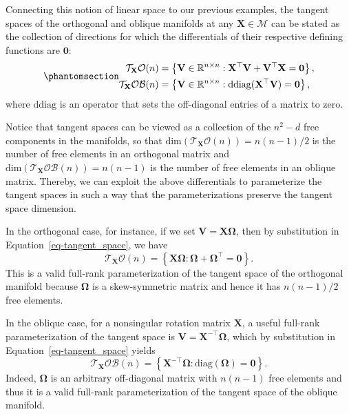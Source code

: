 \documentclass[
  12pt,
  letterpaper,
  article]{scrartcl}
\begin{document}
Connecting this notion of linear space to our previous examples, the
tangent spaces of the orthogonal and oblique manifolds at any
\(\mathbf{X} \in \mathcal{M}\) can be stated as the collection of
directions for which the differentials of their respective defining
functions are \(\mathbf{0}\):
\begin{equation}\protect\phantomsection\label{eq-tangent_space}{
\begin{aligned}
\mathcal{T}_{\mathbf{X}}\mathcal{O}(n) &= \left\{ \mathbf{V}\in\mathbb{R}^{n\times n}: \mathbf{X}^\top\mathbf{V} + \mathbf{V}^\top\mathbf{X} = \mathbf{0} \right\}, \\
\mathcal{T}_{\mathbf{X}}\mathcal{OB}(n) &= \left\{ \mathbf{V}\in\mathbb{R}^{n\times n}: \mathrm{ddiag}(\mathbf{X}^\top\mathbf{V}) = \mathbf{0} \right\},
\end{aligned}
}\end{equation} where \(\mathrm{ddiag}\) is an operator that sets the
off-diagonal entries of a matrix to zero.

Notice that tangent spaces can be viewed as a collection of the
\(n^2-d\) free components in the manifolds, so that
\(\mathrm{dim}(\mathcal{T}_{\mathbf{X}}\mathcal{O}(n)) = n(n-1)/2\) is
the number of free elements in an orthogonal matrix and
\(\mathrm{dim}(\mathcal{T}_{\mathbf{X}}\mathcal{OB}(n)) = n(n-1)\) is
the number of free elements in an oblique matrix. Thereby, we can
exploit the above differentials to parameterize the tangent spaces in
such a way that the parameterizations preserve the tangent space
dimension.

In the orthogonal case, for instance, if we set
\(\mathbf{V} = \mathbf{X\Omega}\), then by substitution in
Equation~\ref{eq-tangent_space}, we have \[
\mathcal{T}_{\mathbf{X}}\mathcal{O}(n) = \left\{ \mathbf{X\Omega}: \mathbf{\Omega} + \mathbf{\Omega}^\top = \mathbf{0} \right\}.
\] This is a valid full-rank parameterization of the tangent space of
the orthogonal manifold because \(\mathbf{\Omega}\) is a skew-symmetric
matrix and hence it has \(n(n-1)/2\) free elements.

In the oblique case, for a nonsingular rotation matrix \(\mathbf{X}\), a
useful full-rank parameterization of the tangent space is
\(\mathbf{V} = \mathbf{X}^{-\top} \mathbf{\Omega}\), which by
substitution in Equation~\ref{eq-tangent_space} yields \[
\mathcal{T}_{\mathbf{X}}\mathcal{OB}(n)
=
\left\{
\mathbf{X}^{-\top}\mathbf{\Omega}:
\mathrm{diag}(\mathbf{\Omega})
=
\mathbf{0}
\right\}.
\] Indeed, \(\mathbf{\Omega}\) is an arbitrary off-diagonal matrix with
\(n(n-1)\) free elements and thus it is a valid full-rank
parameterization of the tangent space of the oblique manifold.
\end{document}
